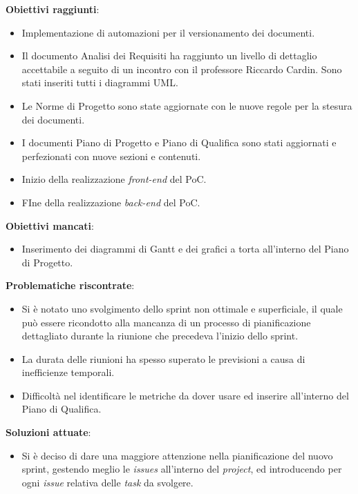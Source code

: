 \textbf{Obiettivi raggiunti}:
\begin{itemize}
	\item Implementazione di automazioni per il versionamento dei documenti.
	\item Il documento Analisi dei Requisiti ha raggiunto un livello di dettaglio accettabile a seguito di un incontro con il professore Riccardo Cardin.
		  Sono stati inseriti tutti i diagrammi UML.
	\item Le Norme di Progetto sono state aggiornate con le nuove regole per la stesura dei documenti.
	\item I documenti Piano di Progetto e Piano di Qualifica sono stati aggiornati e perfezionati con nuove sezioni e contenuti.
	\item Inizio della realizzazione \textit{front-end} del PoC.
	\item FIne della realizzazione \textit{back-end} del PoC.
\end{itemize}

\textbf{Obiettivi mancati}:
\begin{itemize}
	\item Inserimento dei diagrammi di Gantt e dei grafici a torta all'interno del Piano di Progetto.
\end{itemize}

\textbf{Problematiche riscontrate}:
\begin{itemize}
	\item Si è notato uno svolgimento dello sprint non ottimale e superficiale, il quale può essere ricondotto alla mancanza di un processo di pianificazione 
	dettagliato durante la riunione che precedeva l'inizio dello sprint.
	\item La durata delle riunioni ha spesso superato le previsioni a causa di inefficienze temporali.
	\item Difficoltà nel identificare le metriche da dover usare ed inserire all'interno del Piano di Qualifica.
\end{itemize}

\textbf{Soluzioni attuate}:
\begin{itemize}
	\item Si è deciso di dare una maggiore attenzione nella pianificazione del nuovo sprint, gestendo meglio le \textit{issues} all'interno del \textit{project}, ed introducendo per ogni
	\textit{issue} relativa delle \textit{task} da svolgere.
\end{itemize}




